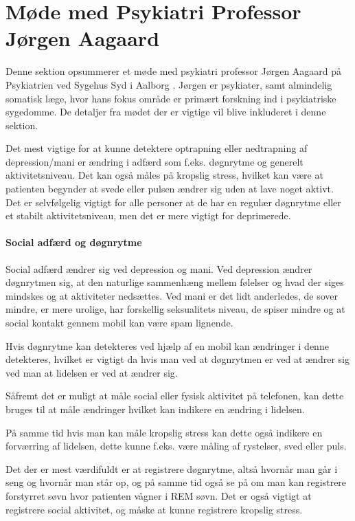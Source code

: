 \section{Møde med Psykiatri Professor Jørgen Aagaard}\label{sec:moede-med-joergen}
Denne sektion opsummerer et møde med psykiatri professor Jørgen Aagaard på Psykiatrien ved Sygehus Syd i Aalborg \citep{misc:jorgen-aagaard}. 
Jørgen er psykiater, samt almindelig somatisk læge, hvor hans fokus område er primært forskning ind i psykiatriske sygedomme.
De detaljer fra mødet der er vigtige vil blive inkluderet i denne sektion.


Det mest vigtige for at kunne detektere optrapning eller nedtrapning af depression/mani er ændring i adfærd som f.eks. døgnrytme og generelt aktivitetsniveau. 
Det kan også måles på kropslig stress, hvilket kan være at patienten begynder at svede eller pulsen ændrer sig uden at lave noget aktivt. 
Det er selvfølgelig vigtigt for alle personer at de har en regulær døgnrytme eller et stabilt aktivitetsniveau, men det er mere vigtigt for deprimerede.

\paragraph{Social adfærd og døgnrytme}
Social adfærd ændrer sig ved depression og mani.
Ved depression ændrer døgnrytmen sig, at den naturlige sammenhæng mellem følelser og hvad der siges mindskes og at aktiviteter nedsættes.
Ved mani er det lidt anderledes, de sover mindre, er mere urolige, har forskellig seksualitets niveau, de spiser mindre og at social kontakt gennem mobil kan være spam lignende. 

Hvis døgnrytme kan detekteres ved hjælp af en mobil kan ændringer i denne detekteres, hvilket er vigtigt da hvis man ved at døgnrytmen er ved at ændrer sig ved man at lidelsen er ved at ændrer sig.

Såfremt det er muligt at måle social eller fysisk aktivitet på telefonen, kan dette bruges til at måle ændringer hvilket kan indikere en ændring i lidelsen.

På samme tid hvis man kan måle kropslig stress kan dette også indikere en forværring af lidelsen, dette kunne f.eks. være måling af rystelser, sved eller puls. 

Det der er mest værdifuldt er at registrere døgnrytme, altså hvornår man går i seng og hvornår man står op, og på samme tid også se på om man kan registrere forstyrret søvn hvor patienten vågner i REM søvn. 
Det er også vigtigt at registrere social aktivitet, og måske at kunne registrere kropslig stress.

